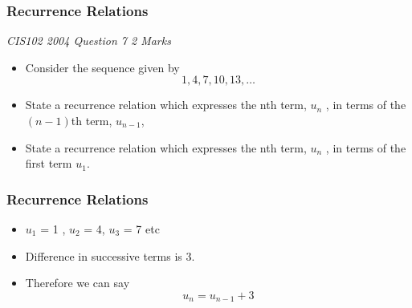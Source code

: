 	
	\begin{frame}
		\frametitle{Recurrence Relations}
		\textit{CIS102 2004 Question 7 2 Marks}
		\Large
		
		\begin{itemize}
			\item Consider the sequence given by \[ 1, 4, 7, 10, 13, \ldots\]
			\item State a recurrence relation which expresses the nth term, $u_n$
			, in terms of the$(n - 1)$th term, $u_{n-1}$, 
			\item State a recurrence relation which expresses the nth term, $u_n$
			, in terms of the first term $u_1$.
		\end{itemize}
		
	\end{frame}
	\begin{frame}
		\frametitle{Recurrence Relations}
		\Large
		\begin{itemize}
			\item $u_1$ = 1 , $u_2$ = 4, $u_3$ = 7 etc 
			\item Difference in successive terms is 3.
			\item Therefore we can say 
			\[ u_n = u_{n-1} + 3 \]
		\end{itemize}
	\end{frame}
